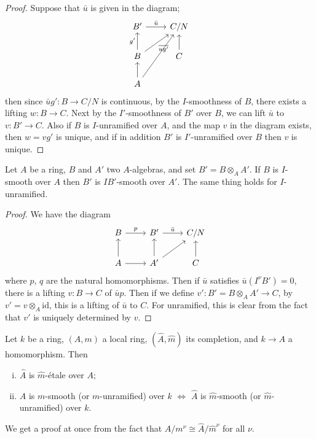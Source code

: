 \begin{proof}
Suppose that $\bar{u}$ is given in the diagram;
\[
\begin{tikzcd}
B' \arrow[r, "\bar{u}"] & C/N \\
B \arrow[u, "g'"] \arrow[ru, "\overline{ug'}"'] & C \arrow[u] \\
A \arrow[u] \arrow[ruu] & 
\end{tikzcd}
\]
then since $\bar{u}g'\colon B \to C/N$ is continuous, by the $I$-smoothness of $B$, there
exists a lifting $w\colon B \to C$. Next by the $I'$-smoothness of $B'$ over $B$, we can
lift $\bar{u}$ to $v\colon B' \to C$. Also if $B$ is $I$-unramified over $A$, and the map $v$ in
the diagram exists, then $w = vg'$ is unique, and if in addition $B'$ is
$I'$-unramified over $B$ then $v$ is unique.
\end{proof}

\begin{theorem}\label{thm:28.2}
Let $A$ be a ring, $B$ and $A'$ two $A$-algebras, and set $B' = B \otimes_A A'$. If $B$ is
$I$-smooth over $A$ then $B'$ is $IB'$-smooth over $A'$. The same thing holds for
$I$-unramified.
\end{theorem}

\begin{proof}
We have the diagram
\[
\begin{tikzcd}
B \arrow[r, "p"] & B' \arrow[r, "\bar{u}"] & C/N \\
A \arrow[u] \arrow[r] & A' \arrow[u] \arrow[ru, ""] & C \arrow[u]
\end{tikzcd}
\]
where $p$, $q$ are the natural homomorphisms. Then if $\bar{u}$ satisfies
$\bar{u}(I^\nu B') = 0$, there is a lifting $v\colon B \to C$ of $\bar{u}p$. Then if we define
$v'\colon B' = B \otimes_A A' \to C$, by $v' = v \otimes_A \mathrm{id}$, this is a lifting of $\bar{u}$ to $C$. For
unramified, this is clear from the fact that $v'$ is uniquely determined by $v$.
\end{proof}

\begin{example*}
Let $k$ be a ring, $(A, m)$ a local ring, $(\hat{A}, \hat{m})$ its completion, and
$k \to A$ a homomorphism. Then
\begin{enumerate}[(i)]
  \item $\hat{A}$ is $\hat{m}$-\'etale over $A$;
  \item $A$ is $m$-smooth (or $m$-unramified) over $k$ $\iff$ $\hat{A}$ is $\hat{m}$-smooth (or
        $\hat{m}$-unramified) over $k$.
\end{enumerate}
We get a proof at once from the fact that $A/m^\nu \cong \hat{A}/\hat{m}^\nu$ for all $\nu$.
\end{example*}

